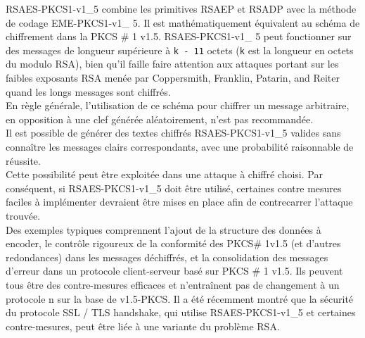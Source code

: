    RSAES-PKCS1-v1\_5 combine les primitives RSAEP et RSADP avec la méthode de codage EME-PKCS1-v1\_ 5. Il est mathématiquement équivalent au schéma de chiffrement dans la PKCS \# 1 v1.5. RSAES-PKCS1-v1\_ 5 peut fonctionner sur des messages de longueur supérieure à \texttt{k - 11} octets (\texttt{k} est la longueur en octets du modulo RSA), bien qu'il faille faire attention aux attaques portant sur les faibles exposants RSA menée par Coppersmith, Franklin, Patarin, and Reiter quand les longs messages sont chiffrés.\\
En règle générale, l'utilisation de ce schéma pour chiffrer un message arbitraire, en opposition à une clef générée aléatoirement, n'est pas recommandée.\\
Il est possible de générer des textes chiffrés RSAES-PKCS1-v1\_5 valides sans connaître les messages clairs correspondants, avec une probabilité raisonnable de réussite.\\
Cette possibilité peut être exploitée dans une attaque à chiffré choisi. Par conséquent, si RSAES-PKCS1-v1\_5 doit être utilisé, certaines contre mesures faciles à implémenter devraient être mises en place afin de contrecarrer l'attaque trouvée.\\
Des exemples typiques comprennent l'ajout de la structure des données à encoder, le contrôle rigoureux de la conformité des PKCS\# 1v1.5 (et d'autres redondances) dans les messages déchiffrés, et la consolidation des messages d'erreur dans un protocole client-serveur basé sur PKCS \# 1 v1.5. Ils peuvent tous être des contre-mesures efficaces et n'entraînent pas de changement à un protocole n sur la base de v1.5-PKCS. Il a été récemment montré que la sécurité du protocole SSL / TLS handshake, qui utilise RSAES-PKCS1-v1\_5 et certaines contre-mesures, peut être liée à une variante du problème RSA.\\
  
